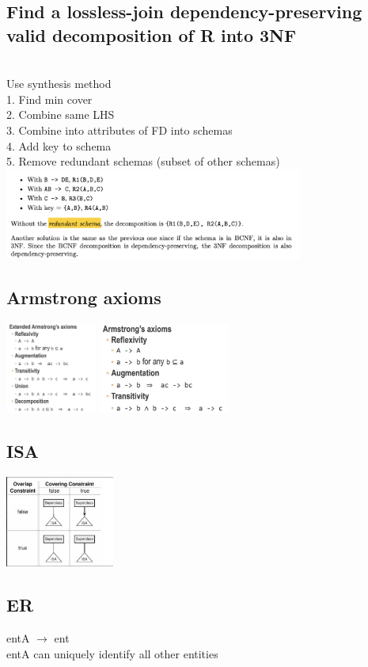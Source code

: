 \documentclass[11pt]{article}
\begin{document}
\begin{multicols*}{3}
\subsection*{Find a lossless-join dependency-preserving valid decomposition of R into 3NF}\\
Use synthesis method\\
1. Find min cover\\
2. Combine same LHS\\
3. Combine into attributes of FD into schemas\\
4. Add key to schema\\
5. Remove redundant schemas (subset of other schemas)\\
\includegraphics[height=3cm]{images/b12}
\subsection*{Armstrong axioms}
\includegraphics[height=3cm]{images/b13}
\includegraphics[height=3cm]{images/b14}
\subsection*{ISA}
\includegraphics[height=3cm]{images/b15}
\subsection*{ER}
entA $\rightarrow$ ent\\
 entA can uniquely identify all other entities
\end{multicols*}
\end{document}

